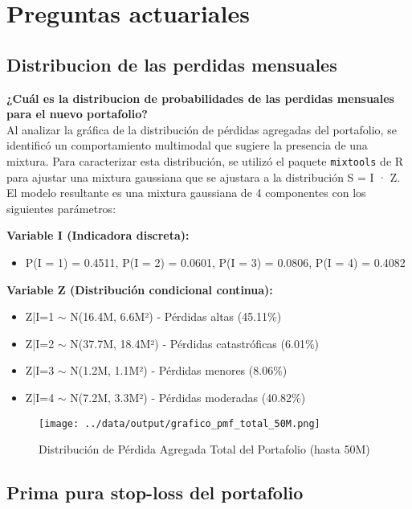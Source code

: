 \section{Preguntas actuariales}

\subsection{Distribucion de las perdidas mensuales}

\textbf{¿Cuál es la distribucion de probabilidades de las perdidas mensuales para el nuevo portafolio?}\\

Al analizar la gráfica de la distribución de pérdidas agregadas del portafolio, se identificó un comportamiento multimodal que sugiere la presencia de una mixtura. Para caracterizar esta distribución, se utilizó el paquete \texttt{mixtools} de R para ajustar una mixtura gaussiana que se ajustara a la distribución S = I · Z.\\

El modelo resultante es una mixtura gaussiana de 4 componentes con los siguientes parámetros:

\textbf{Variable I (Indicadora discreta):}
\begin{itemize}
\item P(I = 1) = 0.4511, P(I = 2) = 0.0601, P(I = 3) = 0.0806, P(I = 4) = 0.4082
\end{itemize}

\textbf{Variable Z (Distribución condicional continua):}
\begin{itemize}
\item Z|I=1 $\sim$ N(16.4M, 6.6M²) - Pérdidas altas (45.11\%)
\item Z|I=2 $\sim$ N(37.7M, 18.4M²) - Pérdidas catastróficas (6.01\%)  
\item Z|I=3 $\sim$ N(1.2M, 1.1M²) - Pérdidas menores (8.06\%)
\item Z|I=4 $\sim$ N(7.2M, 3.3M²) - Pérdidas moderadas (40.82\%)
\end{itemize}

\begin{figure}[H]
\centering
\texttt{[image: ../data/output/grafico\_pmf\_total\_50M.png]}
\caption{Distribución de Pérdida Agregada Total del Portafolio (hasta 50M)}
\label{fig:pmf_total}
\end{figure}

\subsection{Prima pura stop-loss del portafolio}

